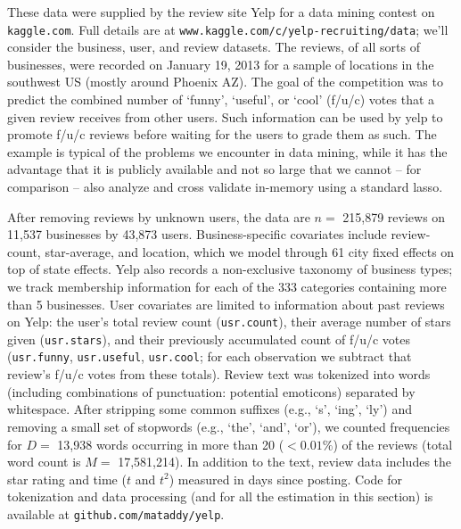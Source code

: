 \documentclass[12pt]{article}
\newcommand{\cd}[1]{{\tt#1}}
\begin{document}
\begin{table}[p]
\end{table}

These data were supplied by the review site Yelp for a data mining contest on \cd{kaggle.com}.  Full details are at \cd{www.kaggle.com/c/yelp\!-\!recruiting/data}; we'll consider the business, user, and review datasets.  The reviews, of all sorts of businesses, were recorded on January 19, 2013 for a sample of locations in the southwest US (mostly around Phoenix AZ).  The goal of the competition was to predict the combined number of `funny', `useful', or `cool' (f/u/c) votes that a given review receives from other users.  Such information can be used by yelp to promote f/u/c  reviews before waiting for the users to grade them as such.  
The example is typical of the problems we encounter in data mining, while it has the advantage that it is publicly available and not so large that we cannot -- for comparison -- also analyze and cross validate in-memory using a standard lasso.

After removing reviews by unknown users, the data are $n=$ 215,879 reviews on
11,537 businesses by 43,873 users. Business-specific covariates include review-
count, star-average, and location, which we model through 61 city
fixed effects on top of state effects.  Yelp also records a non-exclusive
taxonomy of business types; we track membership information for each of the
333 categories  containing more than 5 businesses. User covariates are
limited to information about past reviews on Yelp: the user's total review count
(\cd{usr.count}), their average number of stars given (\cd{usr.stars}), and
their previously accumulated count of f/u/c votes (\cd{usr.funny},
\cd{usr.useful}, \cd{usr.cool}; for each observation we subtract that
review's f/u/c votes from these totals). Review text was tokenized into
words (including combinations of punctuation: potential emoticons) separated
by whitespace. After stripping some common suffixes (e.g., `s', `ing', `ly')
and removing a small set of stopwords (e.g., `the', `and', `or'), we counted
frequencies for $D=$ 13,938 words occurring in more than 20 ($< 0.01\%$) of
the reviews (total word count is $M=$ 17,581,214).  In addition to the text,
review data includes the star rating and time ($t$ and $t^2$)
measured in days since posting.  Code for tokenization and data processing
(and for all the estimation in this section) is available at
\cd{github.com/mataddy/yelp}.
\end{document}

